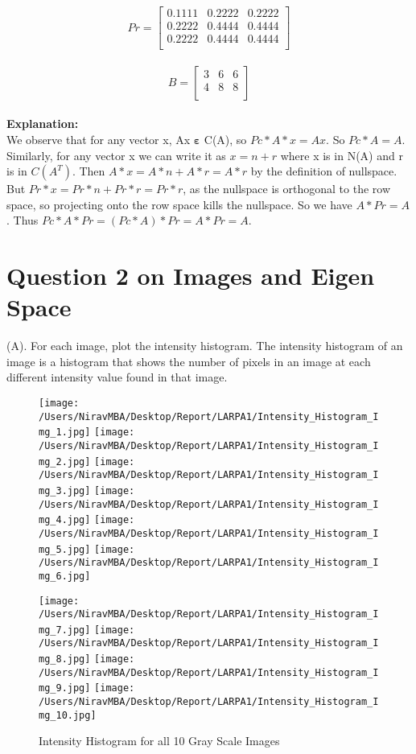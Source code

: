 \documentclass[12pt]{report}
\begin{document}
\[Pr = \begin{bmatrix}
    0.1111  &  0.2222  &  0.2222\\
0.2222  &  0.4444  &  0.4444\\
0.2222  &  0.4444  &  0.4444\\
\end{bmatrix}\]
\\
\[B = \begin{bmatrix}
3&6&6\\
4&8&8\\
\end{bmatrix}\]\\

\noindent
\textbf{Explanation:} \\
We observe that for any vector x, Ax $\mathbf{\varepsilon}$ C(A), so $ Pc*A*x = Ax.$ So $Pc*A = A $. Similarly, for any vector x we can write it as $  x = n + r $ where x is in N(A) and r is in $ C(A^{T}) $. Then $ A*x= A*n + A*r = A*r $ by the definition of nullspace. But $ Pr*x = Pr*n + Pr*r = Pr*r $, as the nullspace is orthogonal to the row space, so projecting onto the row space kills the nullspace. So we have $ A*Pr = A $. Thus $ Pc*A*Pr = (Pc*A)*Pr = A*Pr = A $.
\clearpage

\section*{\LARGE Question 2 on Images and Eigen Space}

(A). For each image, plot the intensity histogram. The intensity histogram of an image is a histogram that shows the number of pixels in an image at each different intensity value
found in that image.

\begin{figure}[H]
	\texttt{[image: /Users/NiravMBA/Desktop/Report/LARPA1/Intensity\_Histogram\_Img\_1.jpg]}
	\texttt{[image: /Users/NiravMBA/Desktop/Report/LARPA1/Intensity\_Histogram\_Img\_2.jpg]}
	\texttt{[image: /Users/NiravMBA/Desktop/Report/LARPA1/Intensity\_Histogram\_Img\_3.jpg]}
	\texttt{[image: /Users/NiravMBA/Desktop/Report/LARPA1/Intensity\_Histogram\_Img\_4.jpg]}
	\texttt{[image: /Users/NiravMBA/Desktop/Report/LARPA1/Intensity\_Histogram\_Img\_5.jpg]}
	\texttt{[image: /Users/NiravMBA/Desktop/Report/LARPA1/Intensity\_Histogram\_Img\_6.jpg]}

\end{figure}


\begin{figure}[H]
	\texttt{[image: /Users/NiravMBA/Desktop/Report/LARPA1/Intensity\_Histogram\_Img\_7.jpg]}
	\texttt{[image: /Users/NiravMBA/Desktop/Report/LARPA1/Intensity\_Histogram\_Img\_8.jpg]}
	\texttt{[image: /Users/NiravMBA/Desktop/Report/LARPA1/Intensity\_Histogram\_Img\_9.jpg]}
	\texttt{[image: /Users/NiravMBA/Desktop/Report/LARPA1/Intensity\_Histogram\_Img\_10.jpg]}
	\caption{Intensity Histogram for all 10 Gray Scale Images}
\end{figure}
\end{document}
